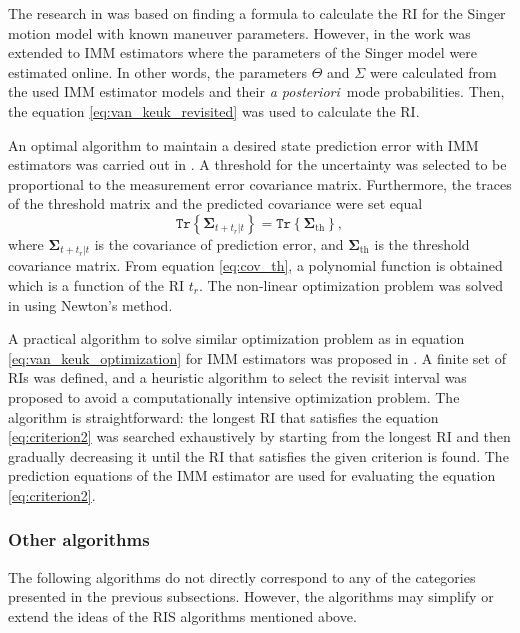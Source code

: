 \documentclass[english, 12pt, a4paper, elec, utf8, a-1b, online]{aaltothesis}
\numberwithin{equation}{section}
\renewcommand{\vec}[1]{\mathbf{#1}}
\newcommand{\tr}[1]{\texttt{Tr}\left\{ #1 \right\}}
\def\post{\textit{a posteriori}\ }
\newcommand{\ri}{t_r}
\begin{document}
The research in \cite{Keuk1975, vanKeuk1993} was based on finding a formula to calculate the RI for the Singer motion model with known maneuver parameters.
However, in \cite{Shin1995} the work was extended to IMM estimators where the parameters of the Singer model were estimated online.
In other words, the parameters $\Theta$ and $\Sigma$ were calculated from the used IMM estimator models and their \post mode probabilities.
Then, the equation \eqref{eq:van_keuk_revisited} was used to calculate the RI.

An optimal algorithm to maintain a desired state prediction error with IMM estimators was carried out in \cite{Watson1993}.
A threshold for the uncertainty was selected to be proportional to the measurement error covariance matrix.
Furthermore, the traces of the threshold matrix and the predicted covariance were set equal
\begin{equation}\label{eq:cov_th}
    \tr{ \vec{\Sigma}_{t+\ri|t} } = \tr{ \vec{\Sigma}_{\text{th}} },
\end{equation}
where $\vec{\Sigma}_{t+\ri|t}$ is the covariance of prediction error, and $\vec{\Sigma}_{\text{th}}$ is the threshold covariance matrix.
From equation \eqref{eq:cov_th}, a polynomial function is obtained which is a function of the RI $\ri$.
The non-linear optimization problem was solved in \cite{Watson1993} using Newton's method.

A practical algorithm to solve similar optimization problem as in equation \eqref{eq:van_keuk_optimization} for IMM estimators was proposed in \cite{Daeipour1994}. A finite set of RIs was defined, and a heuristic algorithm to select the revisit interval was proposed to avoid a computationally intensive optimization problem.
The algorithm is straightforward: the longest RI that satisfies the equation \eqref{eq:criterion2} was searched exhaustively by starting from the longest RI and then gradually decreasing it until the RI that satisfies the given criterion is found. 
The prediction equations of the IMM estimator are used for evaluating the equation \eqref{eq:criterion2}.

\subsubsection{Other algorithms}

The following algorithms do not directly correspond to any of the categories presented in the previous subsections.
However, the algorithms may simplify or extend the ideas of the RIS algorithms mentioned above.
\end{document}
